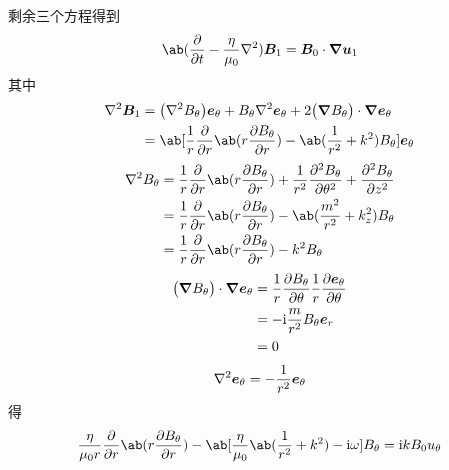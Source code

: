 剩余三个方程得到
\begin{equation}
\ab( \pdv{}{t} - \frac{\eta}{\mu_0} \laplacian{} ) \vec{B}_1 = \vec{B}_0 \cdot \grad{\vec{u}_1}
\end{equation}
其中
\begin{equation}\begin{aligned}
\laplacian{\vec{B}_1} &=
\big(\laplacian{B_\theta}\big) \vec{e}_\theta
+ B_\theta \laplacian{\vec{e}_\theta}
+ 2 \big(\grad{B_\theta}\big) \cdot \grad{\vec{e}_\theta} \\
&= \ab[
\frac{1}{r} \pdv{}{r} \ab(r \pdv{B_\theta}{r})
- \ab(\frac{1}{r^2} + k^2) B_\theta
] \vec{e}_\theta
\end{aligned}\end{equation}
\begin{equation}\begin{aligned}
\laplacian{B_\theta} &= \frac{1}{r} \pdv{}{r} \ab(r \pdv{B_\theta}{r})
+ \frac{1}{r^2} \pdv[2]{B_\theta}{\theta}
+ \pdv[2]{B_\theta}{z} \\
&= \frac{1}{r} \pdv{}{r} \ab(r \pdv{B_\theta}{r})
- \ab(\frac{m^2}{r^2} + k_z^2) B_\theta \\
&= \frac{1}{r} \pdv{}{r} \ab(r \pdv{B_\theta}{r})
- k^2 B_\theta
\end{aligned}\end{equation}
\begin{equation}\begin{aligned}
\big(\bm{\nabla}{B_\theta}\big) \cdot \bm{\nabla}{\bm{e}_\theta}
&= \frac{1}{r} \pdv{B_\theta}{\theta} \frac{1}{r} \pdv{\bm{e}_\theta}{\theta} \\
&= - \mathrm{i} \frac{m}{r^2} B_\theta \bm{e}_r \\
&= 0
\end{aligned}\end{equation}
\begin{equation}
\nabla^2{\bm{e}_\theta} = - \frac{1}{r^2} \bm{e}_\theta
\end{equation}
得
\begin{equation}
\frac{\eta}{\mu_0 r} \pdv{}{r} \ab(r \pdv{B_\theta}{r})
- \ab[ \frac{\eta}{\mu_0} \ab(\frac{1}{r^2} + k^2) - \im \omega ] B_\theta
= \im k B_0 u_\theta
\end{equation}

